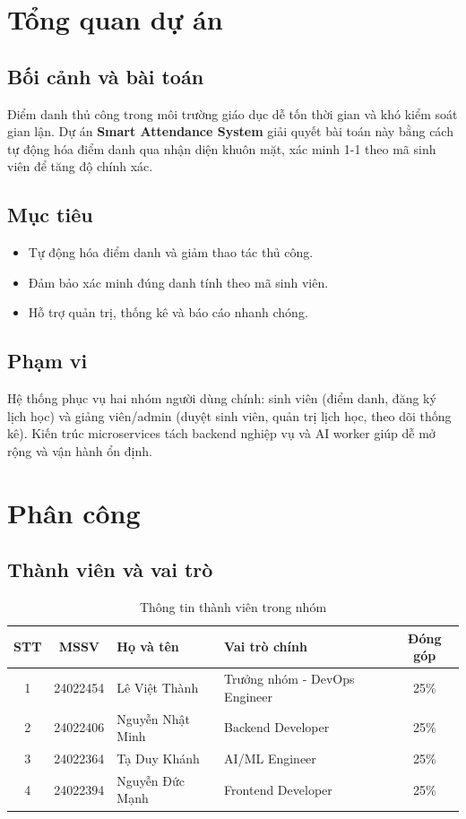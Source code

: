 \documentclass[a4paper,12pt]{report}
\begin{document}
\tableofcontents
\newpage
\listoffigures
\newpage

\chapter{Tổng quan dự án}
\section{Bối cảnh và bài toán}
Điểm danh thủ công trong môi trường giáo dục dễ tốn thời gian và khó kiểm soát gian lận. Dự án \textbf{Smart Attendance System} giải quyết bài toán này bằng cách tự động hóa điểm danh qua nhận diện khuôn mặt, xác minh 1-1 theo mã sinh viên để tăng độ chính xác.

\section{Mục tiêu}
\begin{itemize}
    \item Tự động hóa điểm danh và giảm thao tác thủ công.
    \item Đảm bảo xác minh đúng danh tính theo mã sinh viên.
    \item Hỗ trợ quản trị, thống kê và báo cáo nhanh chóng.
\end{itemize}

\section{Phạm vi}
Hệ thống phục vụ hai nhóm người dùng chính: sinh viên (điểm danh, đăng ký lịch học) và giảng viên/admin (duyệt sinh viên, quản trị lịch học, theo dõi thống kê). Kiến trúc microservices tách backend nghiệp vụ và AI worker giúp dễ mở rộng và vận hành ổn định.

\chapter{Phân công}
\section{Thành viên và vai trò}
\begin{table}[H]
\centering
\begin{tabularx}{\textwidth}{|c|c|X|l|c|}
\hline
\textbf{STT} & \textbf{MSSV} & \textbf{Họ và tên} & \textbf{Vai trò chính} & \textbf{Đóng góp} \\ \hline
1 & 24022454 & Lê Việt Thành & Trưởng nhóm - DevOps Engineer & 25\% \\ \hline
2 & 24022406 & Nguyễn Nhật Minh & Backend Developer & 25\% \\ \hline
3 & 24022364 & Tạ Duy Khánh & AI/ML Engineer & 25\% \\ \hline
4 & 24022394 & Nguyễn Đức Mạnh & Frontend Developer & 25\% \\ \hline
\end{tabularx}
\caption{Thông tin thành viên trong nhóm}
\end{table}
\end{document}
